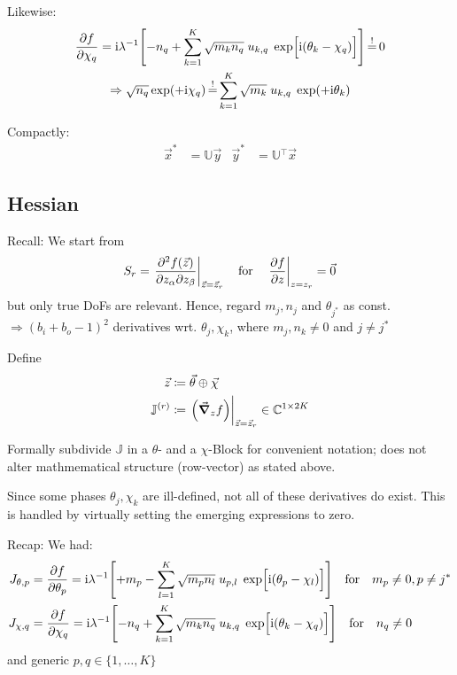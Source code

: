 \documentclass[
	english,
	a4paper,
	fontsize=10pt,
	parskip=half,
	titlepage=true,
	DIV=12,
	final
]{scrreprt}
\newcommand*{\Thus}{\ensuremath{\Rightarrow}\xspace}
\newcommand*{\transp}{\ensuremath{^\intercal}}
\newcommand*{\iunit}{\ensuremath{\mathrm{i}}}
\newcommand*{\setComplex}  {\ensuremath{\mathbb{C}}}
\newcommand*{\equalCond}{  \mathop{=}\limits^!  }
\newcommand*{\set}[1]{\ensuremath{\{#1\}}}
\begin{document}
Likewise:
\begin{gather}
	\pdv{f}{\chi_q}
=
	\iunit\lambda^{-1}
	\qty[
		- n_q
		+
		\sum_{k=1}^{K}
			\sqrt{m_k n_q} \; u_{k,q} \; \exp[ \Big. \iunit(\theta_k - \chi_q) ]
	]
	\label{eqn:JacobianChi}
\equalCond
	0 \\
\Thus
	\sqrt{n_q} \exp(+\iunit \chi_q)
\equalCond
	\sum_{k=1}^{K}
	\sqrt{m_k} \; u_{k,q} \; \exp(+\iunit\theta_k)
	\label{eqn:FourierLinkBackward}
\end{gather}

Compactly:
\begin{align}
	\vec{x}^{*} &= \mathbb{U} \vec{y}
&
	\vec{y}^{*} &= \mathbb{U}\transp \vec{x}
	\label{eqn:MatrixCondition}
\end{align}

\subsection{Hessian}
Recall: We start from
\begin{align}
	S_r
=
	\eval{
		\pdv{f(\vec{z})}%
			{z_\alpha}{z_\beta}
	}_{\vec{z} = \vec{z}_r}
\qfor{}
	\eval{\pdv{f}{z}}_{z=z_r} = \vec{0}
\end{align}
but only true DoFs are relevant. Hence, regard $m_j, n_j$ and $\theta_{j^*}$ as const. \\
\Thus $(b_i + b_o - 1)^{2}$ derivatives wrt. $\theta_j, \chi_k$, where $m_j, n_k \neq 0$ and $j \neq j^*$

Define
\begin{align}
	\vec{z}
&\coloneqq
	\vec{\theta} \oplus \vec{\chi}
\\
	\mathbb{J}^{(r)}
&\coloneqq
	\eval{
		\qty( \big. \grad_z f  )
	}_{\vec{z} = \vec{z}_r}
	\in \setComplex^{1 \times 2K}
\end{align}

Formally subdivide $\mathbb{J}$ in a $\theta$- and a $\chi$-Block for convenient notation; does not alter mathmematical structure (row-vector) as stated above.

Since some phases $\theta_j, \chi_k$ are ill-defined, not all of these derivatives do exist. This is handled by virtually setting the emerging expressions to zero.

Recap: We had:
\begin{align}
	J_{\theta, p} 
&= 
	\pdv{f}{\theta_p}
=
	\iunit \lambda^{-1}
	\qty[
		+m_p
		-
		\sum_{l=1}^{K}
			\sqrt{m_p n_l} \; u_{p,l} \; \exp[\Big. \iunit(\theta_p - \chi_l)]
	]
\qfor{} m_p \neq 0, p \neq j^*
\\
	J_{\chi, q} 
&= 
	\pdv{f}{\chi_q}
=
	\iunit \lambda^{-1}
	\qty[
		-n_q
		+
		\sum_{k=1}^{K}
			\sqrt{m_k n_q} \; u_{k,q} \; \exp[\Big. \iunit(\theta_k - \chi_q)]
	]
\qfor{} n_q \neq 0
\end{align}
and generic $p, q \in \set{1, \ldots, K}$
\end{document}
